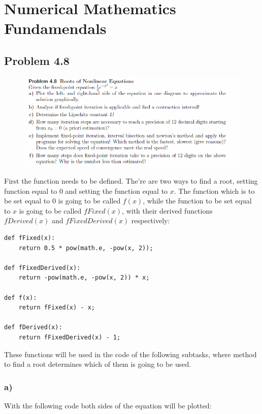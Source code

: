 \section{Numerical Mathematics Fundamendals}

\subsection{Problem 4.8}

\begin{figure}[!ht]
\includegraphics[width=1\textwidth]{chapters/images/desc-4-8}
\end{figure}

First the function needs to be defined. The're are two ways to find a root, setting function equal to 0 and setting the function equal to $x$. The function which is to be set equal to 0 is going to be called $f(x)$, while the function to be set equal to $x$ is going to be called $fFixed(x)$, with their derived functions $fDerived(x)$ and $fFixedDerived(x)$ respectively:

\begin{lstlisting}[caption=Different functions for the equation]
def fFixed(x):
	return 0.5 * pow(math.e, -pow(x, 2));

def fFixedDerived(x):
	return -pow(math.e, -pow(x, 2)) * x;

def f(x):
	return fFixed(x) - x;

def fDerived(x):
	return fFixedDerived(x) - 1;
\end{lstlisting}

These functions will be used in the code of the following subtasks, where method to find a root determines which of them is going to be used.


\subsubsection{a)}

With the following code both sides of the equation will be plotted:

